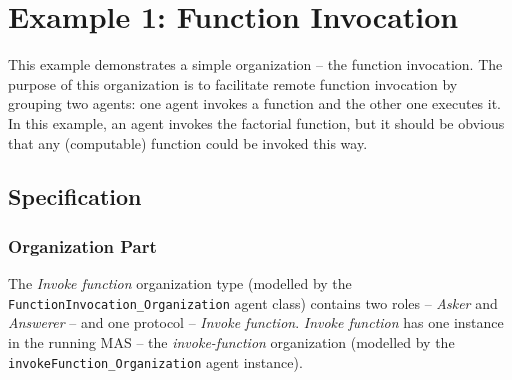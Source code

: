 \section{Example 1: Function Invocation}

This example demonstrates a simple organization -- the function invocation.
The purpose of this organization is to facilitate remote function invocation by grouping two agents: one agent invokes a function and the other one executes it.
In this example, an agent invokes the factorial function, but it should be obvious that any (computable) function could be invoked this way.

\subsection*{Specification}

\subsubsection*{Organization Part}

The \textit{Invoke function} organization type (modelled by the \texttt{FunctionInvocation\_Organization} agent class) contains two roles -- \textit{Asker} and \textit{Answerer} -- and one protocol -- \textit{Invoke function}.
\textit{Invoke function} has one instance in the running MAS -- the \textit{invoke-function} organization (modelled by the \texttt{invokeFunction\_Organization} agent instance).

